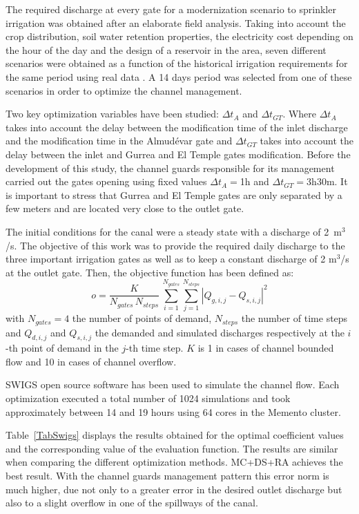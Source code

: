 \documentclass[review,authoryear]{elsarticle}
\newcommand{\EQ}[2]
{\begin{equation}#1\label{#2}\end{equation}}
\newcommand{\ABS}[1]{\left|#1\right|}
\begin{document}
The required discharge at every gate for a modernization scenario to sprinkler irrigation was obtained after an elaborate 
field analysis. Taking into account the crop distribution, soil water retention properties, the electricity cost depending on the hour of the day and the design of a 
reservoir in the area, seven different scenarios were obtained as a function of the historical irrigation requirements for 
the same period using real data \citep{Zapata09}. A 14 days period was selected from
one of these scenarios in order to optimize the channel management.

Two key optimization variables have been studied: $\Delta t_A$ and
$\Delta t_{GT}$. Where $\Delta t_A$ takes into account the delay between the
modification time of the inlet discharge and the modification time in the
Almudévar gate and $\Delta t_{GT}$ takes into account the delay between the
inlet and Gurrea and El Temple gates modification. Before the development of
this  study, the channel guards responsible for its management carried out the
gates opening using fixed values $\Delta t_A=$1h and $\Delta t_{GT}=$3h30m.
It is important to stress that Gurrea and El Temple gates are only separated by
a few meters and are located very close to the outlet gate.

The initial conditions for the canal were a steady state with a discharge of
2~m$^3$/s. The objective of this work was to provide
the required daily discharge to the three important irrigation gates as well as
to keep a constant discharge of 2 m$^3$/s at the outlet gate.
Then, the objective function has been defined as:
\EQ
{
	o=\frac{K}{N_{gates}\,N_{steps}}\,\sum_{i=1}^{N_{gates}}
	\sum_{j=1}^{N_{steps}}\ABS{Q_{g,i,j}-Q_{s,i,j}}^2
}{EqSwigsObjective}
with $N_{gates}=4$ the number of points of demand, $N_{steps}$ the number of 
time steps and $Q_{d,i,j}$ and $Q_{s,i,j}$ the demanded and simulated discharges
respectively at the $i$-th point of demand in the $j$-th time step. $K$ is 1 in cases of channel bounded flow and 10 in cases of channel overflow.

SWIGS open source software \citep{Swigs} has been used to simulate the channel
flow. Each optimization executed a total number of 1024 simulations and took 
approximately between 14 and 19 hours using 64 cores in the Memento cluster.

Table~\ref{TabSwigs} displays the results obtained for the optimal coefficient
values and the corresponding value of the evaluation function.
The results are similar when comparing the different optimization methods.
MC+DS+RA achieves the best result. With the channel guards management pattern
this error norm is much higher, due not only to a greater error in the desired
outlet discharge but also to a slight overflow in one of the spillways of the
canal.
\end{document}
